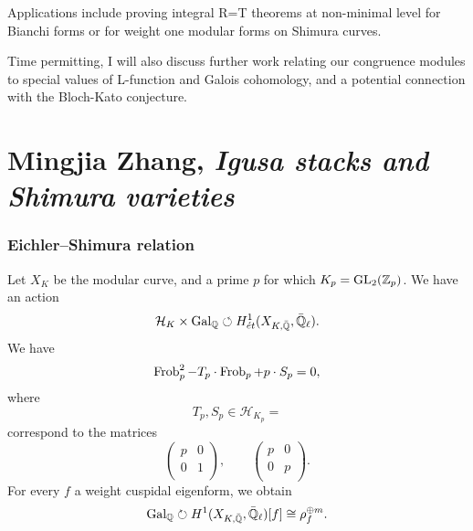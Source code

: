 \documentclass[reqno]{amsart} 
\begin{document}
Applications include proving integral R=T theorems at non-minimal level for Bianchi forms or for weight one modular forms on Shimura curves.

Time permitting, I will also discuss further work relating our congruence modules to special values of L-function and Galois cohomology, and a potential connection with the Bloch-Kato conjecture.

\part{Mingjia Zhang, \emph{Igusa stacks and Shimura varieties}}

\section{Eichler--Shimura relation}

Let $X_K$ be the modular curve, and a prime $p$ for which $K_p = \operatorname{GL}_2(\mathbb{Z}_p)$.  We have an action
\begin{equation*}
  \mathcal{H}_K \times \operatorname{Gal}_{\mathbb{Q}} \circlearrowleft
  H_{\acute{e}t}^1(X_{K, \bar{\mathbb{Q}}}, \bar{\mathbb{Q}}_{\ell}).
\end{equation*}
We have
\begin{equation*}
  \operatorname{Frob}_p^2 - T_p \cdot \operatorname{Frob}_p + p \cdot S_p = 0,
\end{equation*}
where
\begin{equation*}
  T_p, S_p \in \mathcal{H}_{K_p} = 
\end{equation*}
correspond to the matrices
\begin{equation*}
  \begin{pmatrix}
    p    & 0 \\
    0 & 1 \\
  \end{pmatrix}, \qquad
  \begin{pmatrix}
    p    & 0 \\
    0 & p \\
  \end{pmatrix}.
\end{equation*}
For every $f$ a weight cuspidal eigenform, we obtain
\begin{equation*}
  \operatorname{Gal}_{\mathbb{Q}} \circlearrowright H^1(X_{K, \bar{\mathbb{Q}}}, \bar{\mathbb{Q}}_{\ell})[f]
  \cong \rho_f^{\oplus m}.
\end{equation*}
\end{document}

